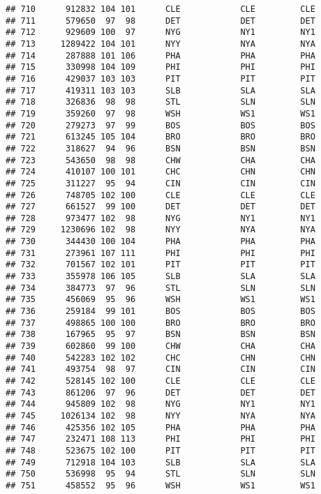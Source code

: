 \documentclass[]{article}
\begin{document}
\begin{verbatim}
## 710      912832 104 101      CLE            CLE         CLE
## 711      579650  97  98      DET            DET         DET
## 712      929609 100  97      NYG            NY1         NY1
## 713     1289422 104 101      NYY            NYA         NYA
## 714      287888 101 106      PHA            PHA         PHA
## 715      330998 104 109      PHI            PHI         PHI
## 716      429037 103 103      PIT            PIT         PIT
## 717      419311 103 103      SLB            SLA         SLA
## 718      326836  98  98      STL            SLN         SLN
## 719      359260  97  98      WSH            WS1         WS1
## 720      279273  97  99      BOS            BOS         BOS
## 721      613245 105 104      BRO            BRO         BRO
## 722      318627  94  96      BSN            BSN         BSN
## 723      543650  98  98      CHW            CHA         CHA
## 724      410107 100 101      CHC            CHN         CHN
## 725      311227  95  94      CIN            CIN         CIN
## 726      748705 102 100      CLE            CLE         CLE
## 727      661527  99 100      DET            DET         DET
## 728      973477 102  98      NYG            NY1         NY1
## 729     1230696 102  98      NYY            NYA         NYA
## 730      344430 100 104      PHA            PHA         PHA
## 731      273961 107 111      PHI            PHI         PHI
## 732      701567 102 101      PIT            PIT         PIT
## 733      355978 106 105      SLB            SLA         SLA
## 734      384773  97  96      STL            SLN         SLN
## 735      456069  95  96      WSH            WS1         WS1
## 736      259184  99 101      BOS            BOS         BOS
## 737      498865 100 100      BRO            BRO         BRO
## 738      167965  95  97      BSN            BSN         BSN
## 739      602860  99 100      CHW            CHA         CHA
## 740      542283 102 102      CHC            CHN         CHN
## 741      493754  98  97      CIN            CIN         CIN
## 742      528145 102 100      CLE            CLE         CLE
## 743      861206  97  96      DET            DET         DET
## 744      945809 102  98      NYG            NY1         NY1
## 745     1026134 102  98      NYY            NYA         NYA
## 746      425356 102 105      PHA            PHA         PHA
## 747      232471 108 113      PHI            PHI         PHI
## 748      523675 102 100      PIT            PIT         PIT
## 749      712918 104 103      SLB            SLA         SLA
## 750      536998  95  94      STL            SLN         SLN
## 751      458552  95  96      WSH            WS1         WS1

\end{verbatim}
\end{document}
